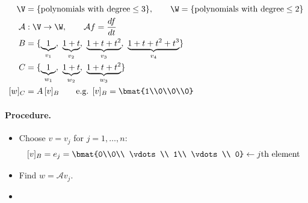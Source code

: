 \begin{example}\leavevmode{}
\begin{align*}
\V&=\{\text{polynomials with degree}\le 3\}, \qquad
\W=\{\text{polynomials with degree}\le 2\}\\
\mathcal{A}&:\V\to\W, \qquad \mathcal{A}f=\frac{df}{dt}\\
B&=\{\underbrace{1}_{v_1},\ \underbrace{1+t}_{v_2},\ \underbrace{1+t+t^2}_{v_3},\ \underbrace{1+t+t^2+t^3}_{v_4}\}\\
C&=\{\underbrace{1}_{w_1},\ \underbrace{1+t}_{w_2},\ \underbrace{1+t+t^2}_{w_3}\}\\
[w]_C&=A\,[v]_B \qquad\text{e.g. } [v]_B=\bmat{1\\0\\0\\0}
\end{align*}

\paragraph{Procedure.}
\begin{itemize}[label=$*$]
\item Choose $v=v_j$ for $j=1,\dots,n$:
\[
[v]_B=e_j=\bmat{0\\0\\ \vdots\\ 1\\ \vdots\\ 0}\leftarrow j\text{th element}
\]
\item Find $w=\mathcal{A}v_j$.
\item {}
\end{itemize}


\end{example}
